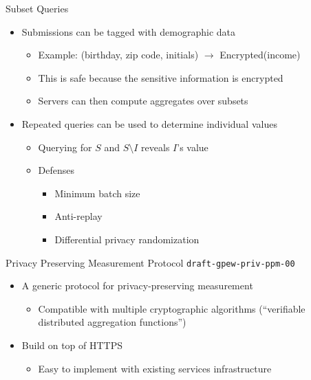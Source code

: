 \documentclass[helvetica]{beamer}
\begin{document}
\begin{frame}{Subset Queries}

  \begin{itemize}
  \item Submissions can be tagged with demographic data
    \begin{itemize}
    \item Example: (birthday, zip code, initials) $\rightarrow$ Encrypted(income)
    \item This is safe because the sensitive information is encrypted      
    \item Servers can then compute aggregates over subsets
    \end{itemize}

  \item Repeated queries can be used to determine individual values
    \begin{itemize}
    \item Querying for $S$ and $S \setminus I$ reveals $I$'s value
    \item Defenses
      \begin{itemize}
      \item Minimum batch size
      \item Anti-replay
      \item Differential privacy randomization
      \end{itemize}
    \end{itemize}
  \end{itemize}
\end{frame}


\begin{frame}{Privacy Preserving Measurement Protocol}
  {\texttt{draft-gpew-priv-ppm-00}}

  \begin{itemize}
  \item A generic protocol for privacy-preserving measurement
    \begin{itemize}
    \item Compatible with multiple cryptographic algorithms (``verifiable distributed aggregation functions'')
    \end{itemize}

  \item Build on top of HTTPS
    \begin{itemize}
    \item Easy to implement with existing services infrastructure
    \end{itemize}
  \end{itemize}
\end{frame}
\end{document}
